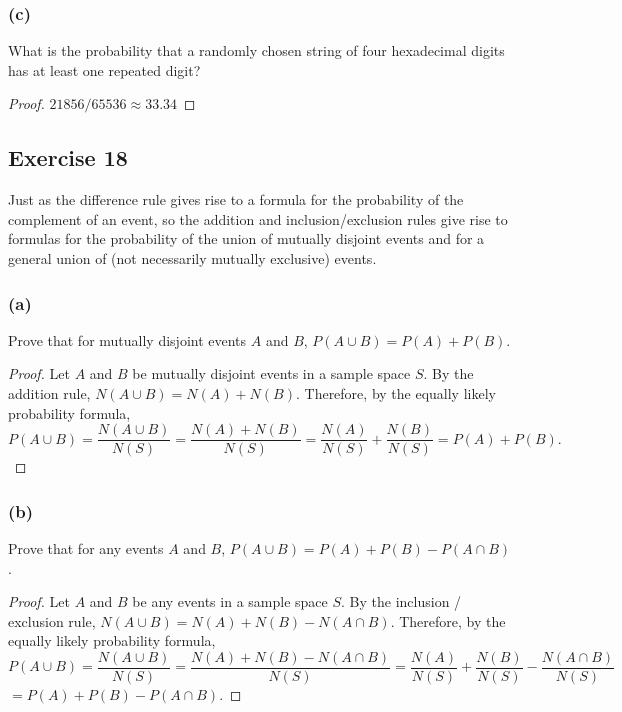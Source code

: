 \documentclass[14pt]{extarticle}
\begin{document}
\subsubsection{(c)}
What is the probability that a randomly chosen string of four hexadecimal digits has at least one repeated digit?

\begin{proof}
     \(21856 / 65536 \approx 33.34\)
\end{proof}

\subsection{Exercise 18}
Just as the difference rule gives rise to a formula for the probability of the complement of an event, so the addition
and inclusion/exclusion rules give rise to formulas for the probability of the union of mutually disjoint events and
for a general union of (not necessarily mutually exclusive) events.

\subsubsection{(a)}
Prove that for mutually disjoint events $A$ and $B$, \(P(A \cup B) = P(A) + P(B)\).

\begin{proof}
     Let $A$ and $B$ be mutually disjoint events in a sample space $S$. By the addition rule, \(N(A \cup B) = N(A) +
     N(B)\). Therefore, by the equally likely probability formula,
     \[
          P(A \cup B)=\frac{N(A\cup B)}{N(S)}=\frac{N(A)+N(B)}{N(S)}= \frac{N(A)}{N(S)} + \frac{N(B)}{N(S)} = P(A) + P(B).
     \]
\end{proof}

\subsubsection{(b)}
Prove that for any events $A$ and $B$, \(P(A \cup B) = P(A) + P(B) - P(A \cap B)\).

\begin{proof}
     Let $A$ and $B$ be any events in a sample space $S$. By the inclusion / exclusion rule, \(N(A \cup B) = N(A) + N(B) -
     N(A \cap B)\). Therefore, by the equally likely probability formula,
     \[
          P(A \cup B) = \frac{N(A \cup B)}{N(S)}=\frac{N(A) + N(B) - N(A \cap B)}{N(S)}= \frac{N(A)}{N(S)} + \frac{N(B)}{N(S)} -
          \frac{N(A \cap B)}{N(S)}
     \]
     \(= P(A) + P(B) - P(A \cap B)\).
\end{proof}
\end{document}
